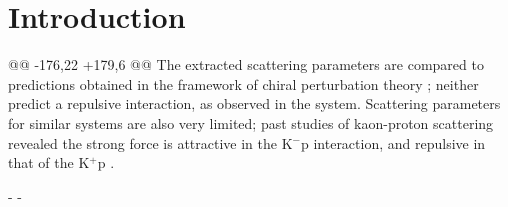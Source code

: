  \section{Introduction}
 \label{sec:Introduction}
 
@@ -176,22 +179,6 @@
 The extracted scattering parameters are compared to predictions obtained in the framework of chiral perturbation theory \cite{Liu:2006xja,Mai:2009ce}; neither predict a repulsive interaction, as observed in the \LamKchP system.
 Scattering parameters for similar systems are also very limited; past studies of kaon-proton scattering revealed the strong force is attractive in the K$^{-}$p interaction, and repulsive in that of the K$^{+}$p \cite{Humphrey:1962zz, Hadjimichef:2002xe, Ikeda:2012au}.
 
-%
-\begin{comment}
-Femtoscopic analyses of pions, kaons, and protons have revealed a trend of decreasing source radii with increasing transverse mass \cite{Adam:2015vja}, which, for identical particle pairs, is defined as $m_{\mathrm{T}}^{2} = m^{2} + k_{\mathrm{T}}^{2}$, where $k_{\mathrm{T}} = \frac{1}{2}|\mathbf{p}_{\mathrm{T},1} + \mathbf{p}_{\mathrm{T},2}|$.  
-This effect is interpreted as a signature of hydrodynamic flow in the heavy-ion collisions \cite{Akkelin:1995gh}. 
-The exponent for \mt-scaling can be shown analytically to be $-\frac{1}{2}$ for case of a one-dimensional longitudinal hydrodynamic expansion with negligible transverse flow and common freeze-out characteristics, regardless of particle species.
-This has lead to an idea of universal \mt-scaling for different particle species.
-However, it is unclear how the picture changes with significant transverse flow, viscosity corrections, and hadronic rescattering.
-Additionally, the scaling observed in models exists separately for the three-dimensional radii in the Longitudinally Co-Moving System (LCMS), and will at best only be approximate in the Pair Rest Frame (PRF) \cite{Adam:2015vja, Kisiel:2014upa}.
-
-The radii extracted from the femtoscopic study are larger than one would except from naively following the trends set forth in the identical particle analyses.  
-However, when dealing with non-identical particles, such as in the present case with \LamK pairs, one should not necessarily expect the exact same trend. 
-In such cases, the pair emission source, measured through femtoscopy, is the superposition of two single-particle sources, each with its own unique size, shape, and space-time position within the medium.
-Although the single-particle sources should abide by the approximate \mt-scaling, the pair sources generally will not.
-\end{comment}
